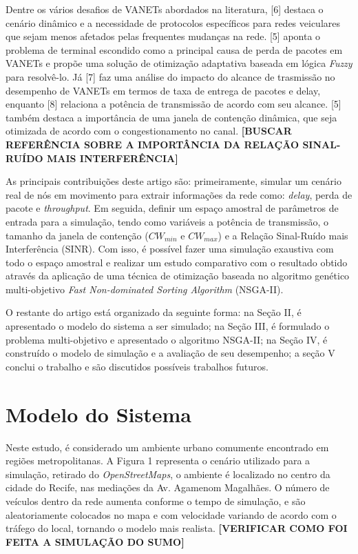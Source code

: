 \documentclass[conference]{IEEEtran}
\begin{document}
Dentre os vários desafios de VANETs abordados na literatura, [6] destaca o cenário dinâmico e a necessidade de protocolos específicos para redes veiculares que sejam menos afetados pelas frequentes mudanças na rede. [5] aponta o problema de terminal escondido como a principal causa de perda de pacotes em VANETs e propõe uma solução de otimização adaptativa baseada em lógica \textit{Fuzzy} para resolvê-lo. Já [7] faz uma análise do impacto do alcance de trasmissão no desempenho de VANETs em termos de taxa de entrega de pacotes e delay, enquanto [8] relaciona a potência de transmissão de acordo com seu alcance. [5] também destaca a importância de uma janela de contenção dinâmica, que seja otimizada de acordo com o congestionamento no canal. \textbf{[BUSCAR REFERÊNCIA SOBRE A IMPORTÂNCIA DA RELAÇÃO SINAL-RUÍDO MAIS INTERFERÊNCIA]}

As principais contribuições deste artigo são: primeiramente, simular um cenário real de nós em movimento para extrair informações da rede como: \textit{delay}, perda de pacote e \textit{throughput}. Em seguida, definir um espaço amostral de parâmetros de entrada para a simulação, tendo como variáveis a potência de transmissão, o tamanho da janela de contenção ($CW_{min}$ e $CW_{max}$) e a Relação Sinal-Ruído mais Interferência (SINR). Com isso, é possível fazer uma simulação exaustiva com todo o espaço amostral e realizar um estudo comparativo com o resultado obtido através da aplicação de uma técnica de otimização baseada no algoritmo genético multi-objetivo \textit{Fast Non-dominated Sorting Algorithm} (NSGA-II).

O restante do artigo está organizado da seguinte forma: na Seção II, é apresentado o modelo do sistema a ser simulado; na Seção III, é formulado o problema multi-objetivo e apresentado o algoritmo NSGA-II; na Seção IV, é construído o modelo de simulação e a avaliação de seu desempenho; a seção V conclui o trabalho e são discutidos possíveis trabalhos futuros.

\section{Modelo do Sistema}

Neste estudo, é considerado um ambiente urbano comumente encontrado em regiões metropolitanas. A Figura 1 representa o cenário utilizado para a simulação, retirado do \textit{OpenStreetMaps}, o ambiente é localizado no centro da cidade do Recife, nas mediações da Av. Agamenom Magalhães. O número de veículos dentro da rede aumenta conforme o tempo de simulação, e são aleatoriamente colocados no mapa e com velocidade variando de acordo com o tráfego do local, tornando o modelo mais realista. \textbf{[VERIFICAR COMO FOI FEITA A SIMULAÇÃO DO SUMO]}
\end{document}
